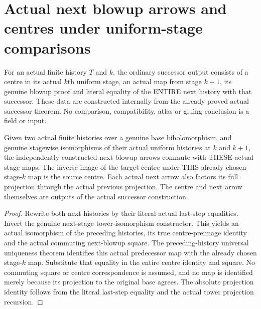 \section{Actual next blowup arrows and centres under uniform-stage comparisons}

\begin{definition}
\label{hir:sharp-actual-curve-uniform-successor-data}
\leanok
For an actual finite history $T$ and $k$, the ordinary successor output
consists of a centre in its actual $k$th uniform stage, an actual map from
stage $k+1$, its genuine blowup proof and literal equality of the ENTIRE
next history with that successor. These data are constructed internally
from the already proved actual successor theorem. No comparison,
compatibility, atlas or gluing conclusion is a field or input.
\end{definition}

\begin{theorem}
\label{hir:sharp-actual-curve-uniform-successor-chosen-map-compatible}
\leanok
Given two actual finite histories over a genuine base biholomorphism,
and genuine stagewise isomorphisms of their actual uniform histories at
$k$ and $k+1$, the independently constructed next blowup arrows commute
with THESE actual stage maps. The inverse image of the target centre
under THIS already chosen stage-$k$ map is the source centre. Each actual
next arrow also factors its full projection through the actual previous
projection. The centre
and next arrow themselves are outputs of the actual successor construction.
\end{theorem}
\begin{proof}
Rewrite both next histories by their literal actual last-step equalities.
Invert the genuine next-stage tower-isomorphism constructor. This yields
an actual isomorphism of the preceding histories, its true centre-preimage
identity and the actual commuting next-blowup square. The preceding-history
universal uniqueness theorem identifies this actual predecessor map with
the already chosen stage-$k$ map. Substitute that equality in the entire
centre identity and square. No commuting square or centre correspondence
is assumed, and no map is identified merely because its projection to the
original base agrees. The absolute projection identity follows from the
literal last-step equality and the actual tower projection recursion.
\end{proof}

